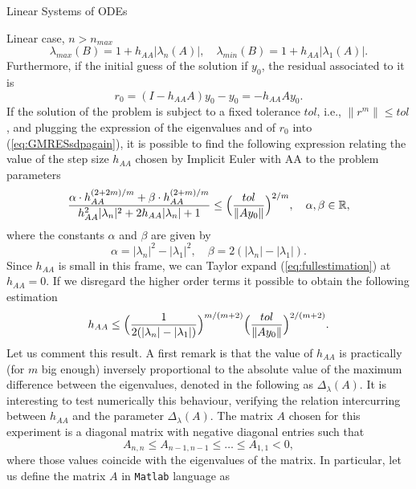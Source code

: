 \documentclass{article}
\begin{document}
\begin{section}{Linear Systems of ODEs}
\begin{subsection}{Linear case, $n > n_{max}$}
\begin{equation*}
	\lambda_{max}(B) = 1 + h_{AA}|\lambda_n(A)|, \quad \lambda_{min}(B) = 1 + h_{AA}|\lambda_1(A)|.
\end{equation*}
Furthermore, if the initial guess of the solution if $y_0$, the residual associated to it is
\begin{equation*}
	r_0 = (I - h_{AA}A)y_0 - y_0 = -h_{AA}Ay_0.
\end{equation*}
If the solution of the problem is subject to a fixed tolerance $tol$, i.e., $\|r^m\| \leq tol$, and plugging the expression of the eigenvalues and of $r_0$ into (\ref{eq:GMRESsdpagain}), it is possible to find the following expression relating the value of the step size $h_{AA}$ chosen by Implicit Euler with AA to the problem parameters
\begin{equation}\label{eq:fullestimation}
	\frac{\alpha\cdot h_{AA}^{(2+2m)/m} + \beta\cdot h_{AA}^{(2+m)/m}}{h_{AA}^2|\lambda_n|^2 + 2h_{AA}|\lambda_n| + 1} \leq \Big{(} \frac{tol}{\|Ay_0\|} \Big{)}^{2/m}, \quad \alpha,\beta \in \mathbb{R},
\end{equation}	
where the constants $\alpha$ and $\beta$ are given by
\begin{equation*}
	\alpha = |\lambda_n|^2 - |\lambda_1|^2, \quad \beta = 2(|\lambda_n| - |\lambda_1|).
\end{equation*}
Since $h_{AA}$ is small in this frame, we can Taylor expand (\ref{eq:fullestimation}) at $h_{AA} = 0$. If we disregard the higher order terms it possible to obtain the following estimation
\begin{equation}\label{eq:lin_est}
	h_{AA} \leq \Big{(}\frac{1}{2(|\lambda_n| - |\lambda_1|)}\Big{)}^{m/(m+2)}\Big{(}\frac{tol}{\|Ay_0\|}\Big{)}^{2/(m+2)}.
\end{equation}
Let us comment this result. A first remark is that the value of $h_{AA}$ is practically (for $m$ big enough) inversely proportional to the absolute value of the maximum difference between the eigenvalues, denoted in the following as $\Delta_\lambda(A)$. It is interesting to test numerically this behaviour, verifying the relation intercurring between $h_{AA}$ and the parameter $\Delta_\lambda(A)$. The matrix $A$ chosen for this experiment is a diagonal matrix with negative diagonal entries such that
\begin{equation*}
	A_{n,n} \leq A_{n-1,n-1} \leq \dots \leq A_{1,1} < 0,
\end{equation*}
where those values coincide with the eigenvalues of the matrix. In particular, let us define the matrix $A$ in \texttt{Matlab} language as 

\end{subsection}
\end{section}
\end{document}
